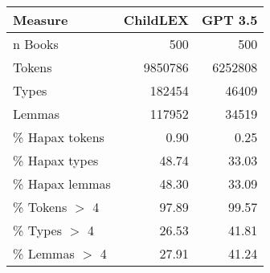 \begin{table}[ht]
\centering
\begin{tabular}{lrr}
  \hline
Measure & ChildLEX & GPT 3.5 \\ 
  \hline
n Books & 500 & 500 \\ 
  Tokens & 9850786 & 6252808 \\ 
  Types & 182454 & 46409 \\ 
  Lemmas & 117952 & 34519 \\ 
  \% Hapax tokens & 0.90 & 0.25 \\ 
  \% Hapax types & 48.74 & 33.03 \\ 
  \% Hapax lemmas & 48.30 & 33.09 \\ 
  \% Tokens $>$ 4 & 97.89 & 99.57 \\ 
  \% Types $>$ 4 & 26.53 & 41.81 \\ 
  \% Lemmas $>$ 4 & 27.91 & 41.24 \\ 
   \hline
\end{tabular}
\end{table}
